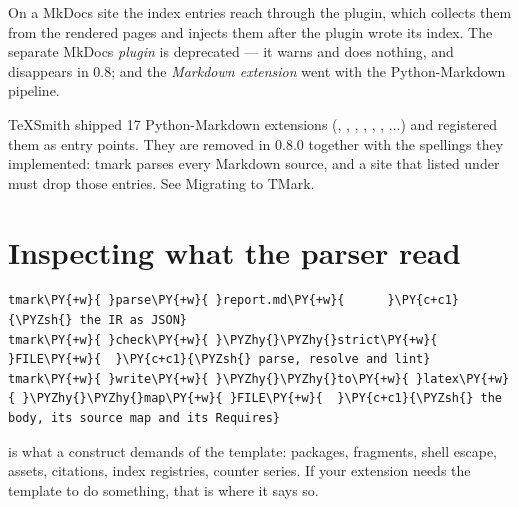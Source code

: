 \documentclass[a4paper,twoside]{article}
\begin{document}
On a MkDocs site the index entries reach  through the
 plugin, which collects them from the rendered pages
and injects them after the  plugin wrote its index. The separate
 MkDocs \emph{plugin} is deprecated --- it warns and does nothing, and
disappears in 0.8; and the  \emph{Markdown extension} went with the
Python-Markdown pipeline.
\begin{tscallout}[kind=note, title={The Python-Markdown extensions are gone}]
TeXSmith shipped 17 Python-Markdown extensions (, ,
, , , , ...) and registered them as
 entry points. They are removed in 0.8.0 together with
the spellings they implemented: tmark parses every Markdown source, and a
site that listed  under  must drop those
entries. See Migrating to TMark.
\end{tscallout}
\section{Inspecting what the parser read}
\begin{tscode}[lang=bash, engine=pygments]
\begin{Verbatim}[commandchars=\\\{\},breaklines, breakanywhere, commandchars=\\\{\}]
tmark\PY{+w}{ }parse\PY{+w}{ }report.md\PY{+w}{      }\PY{c+c1}{\PYZsh{} the IR as JSON}
tmark\PY{+w}{ }check\PY{+w}{ }\PYZhy{}\PYZhy{}strict\PY{+w}{ }FILE\PY{+w}{  }\PY{c+c1}{\PYZsh{} parse, resolve and lint}
tmark\PY{+w}{ }write\PY{+w}{ }\PYZhy{}\PYZhy{}to\PY{+w}{ }latex\PY{+w}{ }\PYZhy{}\PYZhy{}map\PY{+w}{ }FILE\PY{+w}{  }\PY{c+c1}{\PYZsh{} the body, its source map and its Requires}
\end{Verbatim}
\end{tscode}
 is what a construct demands of the template: packages, fragments,
shell escape, assets, citations, index registries, counter series. If your
extension needs the template to do something, that is where it says so.
\end{document}

